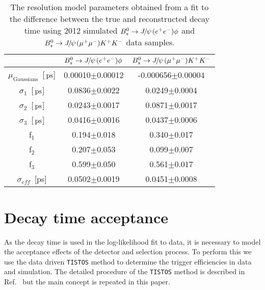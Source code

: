 \begin{table}[htb]
  \caption{
    The resolution model parameters obtained from a fit to the difference between the true and reconstructed decay time using 2012 simulated ${{B}^0_{s}}\rightarrow{\ensuremath{{J\mskip -3mu/\mskip -2mu\psi\mskip 2mu}}}({e^+e^-})\phi$ and ${{B}^0_{s}}\rightarrow{\ensuremath{{J\mskip -3mu/\mskip -2mu\psi\mskip 2mu}}}({\mu^+\mu^-}){{K}^+}{{K}^-}$ data samples.
}
\small{
\begin{center} \begin{tabular}{ccc}
    \hline
    & ${{B}^0_{s}}\rightarrow{\ensuremath{{J\mskip -3mu/\mskip -2mu\psi\mskip 2mu}}}({e^+e^-})\phi$ & ${{B}^0_{s}}\rightarrow{\ensuremath{{J\mskip -3mu/\mskip -2mu\psi\mskip 2mu}}}({\mu^+\mu^-}){{K}^+}{{K}^-}$  \\
    \hline
   $\mu_{\text{Gaussians}}$~[${\mathrm{ \,ps}}$] & 0.00010$\pm$0.00012 & -0.000656$\pm$0.00004  \\
   $\sigma_{1}$~[${\mathrm{ \,ps}}$]& 0.0836$\pm$0.0022 & 0.0249$\pm$0.0004  \\
   $\sigma_{2}$~[${\mathrm{ \,ps}}$]& 0.0243$\pm$0.0017 & 0.0871$\pm$0.0017 \\
   $\sigma_{3}$~[${\mathrm{ \,ps}}$]& 0.0416$\pm$0.0016 & 0.0437$\pm$0.0006 \\
   f$_{1}$ & 0.194$\pm$0.018 & 0.340$\pm$0.017 \\
   f$_{2}$ & 0.207$\pm$0.053 & 0.099$\pm$0.007 \\
   f$_{3}$ & 0.599$\pm$0.050 & 0.561$\pm$0.017 \\
   \hline
   $\sigma_{eff}$~[ps] & 0.0502$\pm$0.0019 & 0.0451$\pm$0.0008  \\
  \hline
    \end{tabular}\end{center}
  }
\label{tab:TimeRes}
\end{table}
\clearpage

\section{Decay time acceptance}\label{sec:TimeAcc}

 As the decay time is used in the log-likelihood fit to data, it is necessary to model the acceptance effects of the detector and selection process. To perform this we use the data driven {\tt TISTOS} method to determine the trigger efficiencies in data and simulation. The detailed procedure of the {\tt TISTOS} method is described in Ref.~\cite{LHCb:PUB-2014-039} but the main concept is repeated in this paper. 
 
